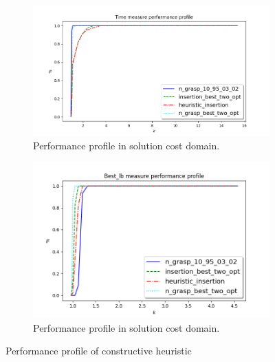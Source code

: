 \begin{figure}
\centering
\begin{subfigure}{.7\textwidth}
	\centering
	\includegraphics[width=\columnwidth]{../res/Lgrasp_insertion_refining_LA_time.png}
	\caption{Performance profile in solution cost domain.}
	\label{fig:Lgrasp_insertion_refining_LA_time}
\end{subfigure}
\begin{subfigure}{.7\textwidth}
	\centering
	\includegraphics[width=\columnwidth]{../res/Lgrasp_insertion_refining_LA_lb.png}
	\caption{Performance profile in solution cost domain.}
	\label{fig:Lgrasp_insertion_refining_LA_lb}
\end{subfigure}
\caption{Performance profile of constructive heuristic}
\label{fig:pp_Lgrasp_insertion_refining}
\end{figure}

